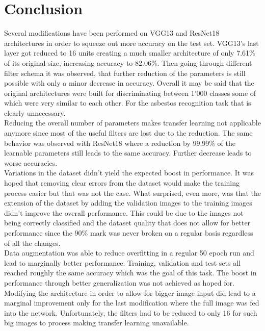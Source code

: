 \quad

\section{Conclusion}

Several modifications have been performed on VGG13 and ResNet18 architectures in order to squeeze out more accuracy on the test set. VGG13's last layer got reduced to 16 units creating a much smaller architecture of only 7.61\% of its original size, increasing accuracy to 82.06\%. Then going through different filter schema it was observed, that further reduction of the parameters is still possible with only a minor decrease in accuracy. Overall it may be said that the original architectures were built for discriminating between 1'000 classes some of which were very similar to each other. For the asbestos recognition task that is clearly unnecessary.\\

Reducing the overall number of parameters makes transfer learning not applicable anymore since most of the useful filters are lost due to the reduction. The same behavior was observed with ResNet18 where a reduction by 99.99\% of the learnable parameters still leads to the same accuracy. Further decrease leads to worse accuracies.\\

Variations in the dataset didn't yield the expected boost in performance. It was hoped that removing clear errors from the dataset would make the training process easier but that was not the case. What surprised, even more, was that the extension of the dataset by adding the validation images to the training images didn't improve the overall performance. This could be due to the images not being correctly classified and the dataset quality that does not allow for better performance since the 90\% mark was never broken on a regular basis regardless of all the changes.\\

Data augmentation was able to reduce overfitting in a regular 50 epoch run and lead to marginally better performance. Training, validation and test sets all reached roughly the same accuracy which was the goal of this task. The boost in performance through better generalization was not achieved as hoped for.\\

Modifying the architecture in order to allow for bigger image input did lead to a marginal improvement only for the last modification where the full image was fed into the network. Unfortunately, the filters had to be reduced to only 16 for such big images to process making transfer learning unavailable.

